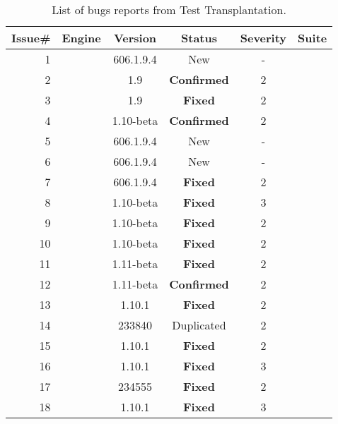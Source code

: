 \begin{table}[t!]
  \renewcommand{\arraystretch}{0.35}
      \centering
      \caption{List of bugs reports from Test Transplantation.}
      \label{tab:test-transplantation-bugs}

      \begin{tabular}{rccccc}

        \toprule Issue\# & Engine  & Version & Status & Severity & Suite \\
        \midrule
       1  & \jsc{} & 606.1.9.4 & New  & - & \jerry{} \\
       2  & \chakra{}  & 1.9 & \textbf{Confirmed} & 2 & \smonkey{} \\
       3  & \chakra{}  & 1.9 & \textbf{Fixed}   & 2 & \smonkey{} \\
       4  & \chakra{} & 1.10-beta & \textbf{Confirmed} & 2 & \smonkey{} \\
       5  & \jsc{} & 606.1.9.4 & New &  -  & \smonkey{}\\
       6  & \jsc{} & 606.1.9.4 & New & - & \smonkey{} \\
       7  & \jsc{} & 606.1.9.4 & \textbf{Fixed} & 2 & \smonkey{}\\ %
       8  & \chakra{} & 1.10-beta & \textbf{Fixed} & 3 & \smonkey{}\\
       9  & \chakra{} & 1.10-beta & \textbf{Fixed} & 2 & \jsc{}\\
       10 & \chakra{} & 1.10-beta & \textbf{Fixed} & 2 & \smonkey{}\\
       11 & \chakra{} & 1.11-beta & \textbf{Fixed} & 2 & \jsc{}\\
       12 & \chakra{} & 1.11-beta & \textbf{Confirmed} & 2 & \jerry{}\\ %
       13 & \chakra{} & 1.10.1 & \textbf{Fixed} & 2 & \smonkey{}\\
       14 & \jsc{} & 233840 & Duplicated & 2 & \jerry{}\\
       15 & \chakra{} & 1.10.1 & \textbf{Fixed} & 2 & \jerry{}\\ %
       16 & \chakra{} & 1.10.1 & \textbf{Fixed} & 3 & \jerry{}\\
       17 & \jsc{} & 234555 &\textbf{Fixed} & 2 & \jerry{}\\
       18 & \chakra{} & 1.10.1 & \textbf{Fixed} & 3 & \jerry{}\\

\end{tabular}
\end{table}
